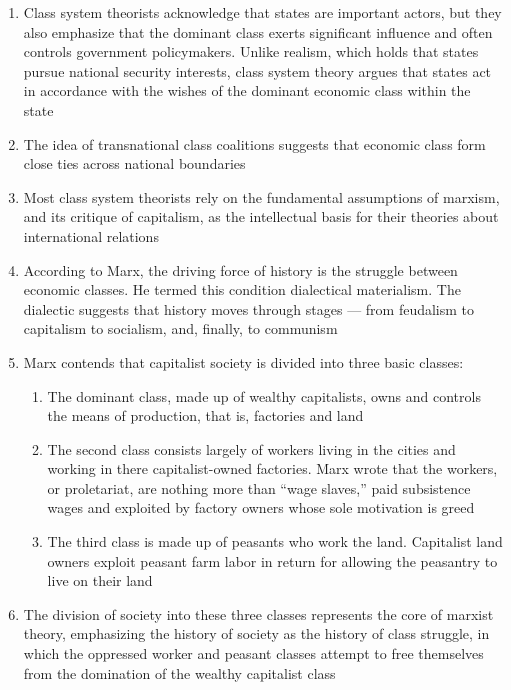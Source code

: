 \documentclass[12pt]{article}
\begin{document}
\begin{enumerate}
      \item Class system theorists acknowledge that states are important actors, but they also emphasize that the dominant class exerts significant influence and often controls government policymakers. Unlike realism, which holds that states pursue national security interests, class system theory argues that states act in accordance with the wishes of the dominant economic class within the state

      \item The idea of transnational class coalitions suggests that economic class form close ties across national boundaries

      \item Most class system theorists rely on the fundamental assumptions of marxism, and its critique of capitalism, as the intellectual basis for their theories about international relations

      \item According to Marx, the driving force of history is the struggle between economic classes. He termed this condition dialectical materialism. The dialectic suggests that history moves through stages — from feudalism to capitalism to socialism, and, finally, to communism

      \item Marx contends that capitalist society is divided into three basic classes:

        \begin{enumerate}

          \item The dominant class, made up of wealthy capitalists, owns and controls the means of production, that is, factories and land

          \item The second class consists largely of workers living in the cities and working in there capitalist-owned factories. Marx wrote that the workers, or proletariat, are nothing more than “wage slaves,” paid subsistence wages and exploited by factory owners whose sole motivation is greed

          \item The third class is made up of peasants who work the land. Capitalist land owners exploit peasant farm labor in return for allowing the peasantry to live on their land

        \end{enumerate}

      \item The division of society into these three classes represents the core of marxist theory, emphasizing the history of society as the history of class struggle, in which the oppressed worker and peasant classes attempt to free themselves from the domination of the wealthy capitalist class


\end{enumerate}
\end{document}
